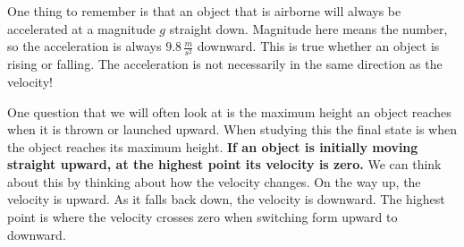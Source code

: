 \documentclass[12pt]{book}
\begin{document}
One thing to remember is that an object that is airborne will always be accelerated at a magnitude $g$ straight down. Magnitude here means the number, so the acceleration is always $9.8 \, \frac{m}{s^2}$ downward. This is true whether an object is rising or falling. The acceleration is not necessarily in the same direction as the velocity!

One question that we will often look at is the maximum height an object reaches when it is thrown or launched upward. When studying this the final state is when the object reaches its maximum height. \textbf{If an object is initially moving straight upward, at the highest point its velocity is zero.} We can think about this by thinking about how the velocity changes. On the way up, the velocity is upward. As it falls back down, the velocity is downward. The highest point is where the velocity crosses zero when switching form upward to downward.
\end{document}
